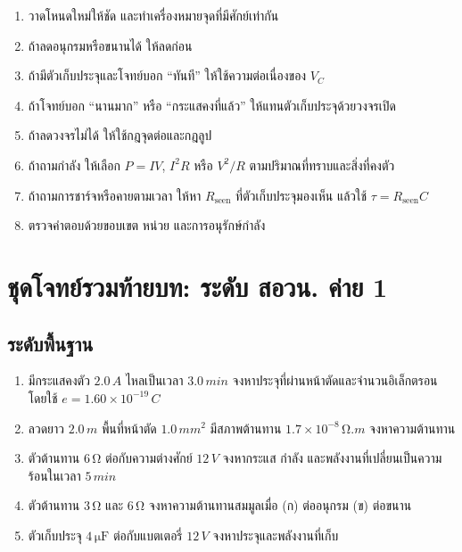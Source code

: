\begin{tcolorbox}[title={แผนแก้โจทย์วงจร}]
\begin{enumerate}
    \item วาดโหนดใหม่ให้ชัด และทำเครื่องหมายจุดที่มีศักย์เท่ากัน
    \item ถ้าลดอนุกรมหรือขนานได้ ให้ลดก่อน
    \item ถ้ามีตัวเก็บประจุและโจทย์บอก ``ทันที'' ให้ใช้ความต่อเนื่องของ $V_C$
    \item ถ้าโจทย์บอก ``นานมาก'' หรือ ``กระแสคงที่แล้ว'' ให้แทนตัวเก็บประจุด้วยวงจรเปิด
    \item ถ้าลดวงจรไม่ได้ ให้ใช้กฎจุดต่อและกฎลูป
    \item ถ้าถามกำลัง ให้เลือก $P=IV$, $I^2R$ หรือ $V^2/R$ ตามปริมาณที่ทราบและสิ่งที่คงตัว
    \item ถ้าถามการชาร์จหรือคายตามเวลา ให้หา $R_{\text{seen}}$ ที่ตัวเก็บประจุมองเห็น แล้วใช้ $\tau=R_{\text{seen}}C$
    \item ตรวจคำตอบด้วยขอบเขต หน่วย และการอนุรักษ์กำลัง
\end{enumerate}
\end{tcolorbox}

\section{ชุดโจทย์รวมท้ายบท: ระดับ สอวน. ค่าย 1}

\subsection*{ระดับพื้นฐาน}

\begin{enumerate}
    \item มีกระแสคงตัว $2.0\,\si{A}$ ไหลเป็นเวลา $3.0\,\si{min}$ จงหาประจุที่ผ่านหน้าตัดและจำนวนอิเล็กตรอน โดยใช้ $e=1.60\times10^{-19}\,\si{C}$

    \item ลวดยาว $2.0\,\si{m}$ พื้นที่หน้าตัด $1.0\,\si{mm^2}$ มีสภาพต้านทาน $1.7\times10^{-8}\,\si{\ohm.m}$ จงหาความต้านทาน

    \item ตัวต้านทาน $6\,\si{\ohm}$ ต่อกับความต่างศักย์ $12\,\si{V}$ จงหากระแส กำลัง และพลังงานที่เปลี่ยนเป็นความร้อนในเวลา $5\,\si{min}$

    \item ตัวต้านทาน $3\,\si{\ohm}$ และ $6\,\si{\ohm}$ จงหาความต้านทานสมมูลเมื่อ (ก) ต่ออนุกรม (ข) ต่อขนาน

    \item ตัวเก็บประจุ $4\,\si{\micro\farad}$ ต่อกับแบตเตอรี่ $12\,\si{V}$ จงหาประจุและพลังงานที่เก็บ
\end{enumerate}

